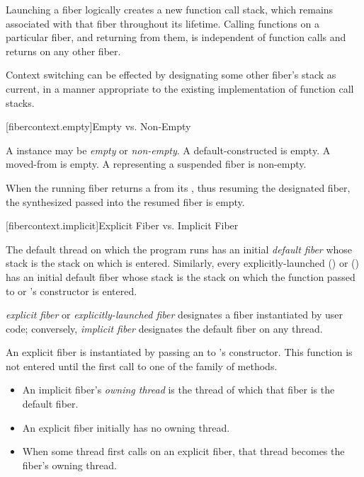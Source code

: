 \para Launching a fiber logically creates a new function call stack, which remains
associated with that fiber throughout its lifetime. Calling functions on a
particular fiber, and returning from them, is independent of function calls
and returns on any other fiber.

\para Context switching can be effected by designating some other fiber's stack as
current, in a manner appropriate to the existing implementation of function call stacks.

[fibercontext.empty]{Empty vs. Non-Empty}

\para A \fiber instance may be \emph{empty} or \emph{non-empty}. A
default-constructed \fiber is empty. A moved-from \fiber is empty. A \fiber
representing a suspended fiber is non-empty.

\para When the running fiber returns a \fiber from its \entryfn, thus resuming the
designated fiber, the synthesized \fiber passed into the resumed fiber is
empty.

[fibercontext.implicit]{Explicit Fiber vs. Implicit Fiber}

\para The default thread on which the program runs \main has an
initial \emph{default fiber} whose stack is the stack on which \main is
entered.  Similarly, every
explicitly-launched  ()
or  () has an initial
default fiber whose stack is the stack on which the function passed
to  or 's constructor is entered.

\para \emph{explicit fiber} or \emph{explicitly-launched fiber}
designates a fiber instantiated by user code; conversely, \emph{implicit fiber}
designates the default fiber on any thread.

\para An explicit fiber is instantiated by passing an \emph{\entryfn} to \fiber's
constructor. This function is not entered until the first call to one of
the  family of methods.

\begin{itemize}
    \item An implicit fiber's \emph{owning thread} is the thread of which that
          fiber is the default fiber.
    \item An explicit fiber initially has no owning thread.
    \item When some thread first calls \anyresume on an explicit fiber, that
          thread becomes the fiber's owning thread.
\end{itemize}

